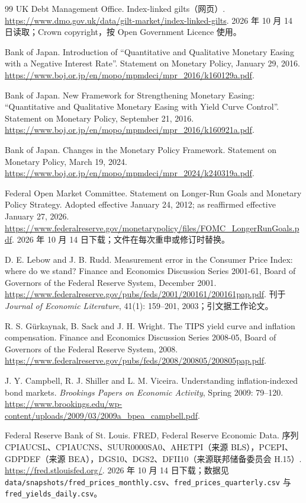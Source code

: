 \begin{thebibliography}{99}
 UK Debt Management Office. Index-linked gilts（网页）. \url{https://www.dmo.gov.uk/data/gilt-market/index-linked-gilts}. 2026 年 10 月 14 日读取；Crown copyright，按 Open Government Licence 使用。

 Bank of Japan. Introduction of ``Quantitative and Qualitative Monetary Easing with a Negative Interest Rate''. Statement on Monetary Policy, January 29, 2016. \url{https://www.boj.or.jp/en/mopo/mpmdeci/mpr_2016/k160129a.pdf}.

 Bank of Japan. New Framework for Strengthening Monetary Easing: ``Quantitative and Qualitative Monetary Easing with Yield Curve Control''. Statement on Monetary Policy, September 21, 2016. \url{https://www.boj.or.jp/en/mopo/mpmdeci/mpr_2016/k160921a.pdf}.

 Bank of Japan. Changes in the Monetary Policy Framework. Statement on Monetary Policy, March 19, 2024. \url{https://www.boj.or.jp/en/mopo/mpmdeci/mpr_2024/k240319a.pdf}.

 Federal Open Market Committee. Statement on Longer-Run Goals and Monetary Policy Strategy. Adopted effective January 24, 2012; as reaffirmed effective January 27, 2026. \url{https://www.federalreserve.gov/monetarypolicy/files/FOMC_LongerRunGoals.pdf}. 2026 年 10 月 14 日下载；文件在每次重申或修订时替换。

 D. E. Lebow and J. B. Rudd. Measurement error in the Consumer Price Index: where do we stand? Finance and Economics Discussion Series 2001-61, Board of Governors of the Federal Reserve System, December 2001. \url{https://www.federalreserve.gov/pubs/feds/2001/200161/200161pap.pdf}. 刊于 \emph{Journal of Economic Literature}, 41(1): 159--201, 2003；引文据工作论文。

 R. S. Gürkaynak, B. Sack and J. H. Wright. The TIPS yield curve and inflation compensation. Finance and Economics Discussion Series 2008-05, Board of Governors of the Federal Reserve System, 2008. \url{https://www.federalreserve.gov/pubs/feds/2008/200805/200805pap.pdf}.

 J. Y. Campbell, R. J. Shiller and L. M. Viceira. Understanding inflation-indexed bond markets. \emph{Brookings Papers on Economic Activity}, Spring 2009: 79--120. \url{https://www.brookings.edu/wp-content/uploads/2009/03/2009a_bpea_campbell.pdf}.

 Federal Reserve Bank of St. Louis. FRED, Federal Reserve Economic Data. 序列 CPIAUCSL、CPIAUCNS、SUUR0000SA0、AHETPI（来源 BLS），PCEPI、GDPDEF（来源 BEA），DGS10、DGS2、DFII10（来源联邦储备委员会 H.15）. \url{https://fred.stlouisfed.org/}. 2026 年 10 月 14 日下载；数据见 \texttt{data/snapshots/fred\_prices\_monthly.csv}、\texttt{fred\_prices\_quarterly.csv} 与 \texttt{fred\_yields\_daily.csv}。


\end{thebibliography}
